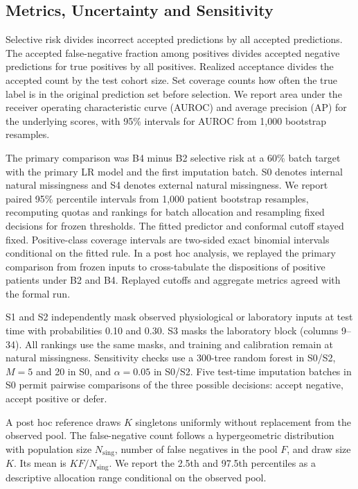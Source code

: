 \documentclass[conference]{IEEEtran}
\begin{document}
\subsection{Metrics, Uncertainty and Sensitivity}

Selective risk divides incorrect accepted predictions by all accepted predictions. The accepted false-negative fraction among positives divides accepted negative predictions for true positives by all positives. Realized acceptance divides the accepted count by the test cohort size. Set coverage counts how often the true label is in the original prediction set before selection. We report area under the receiver operating characteristic curve (AUROC) and average precision (AP) for the underlying scores, with 95\% intervals for AUROC from 1,000 bootstrap resamples.

The primary comparison was B4 minus B2 selective risk at a 60\% batch target with the primary LR model and the first imputation batch. S0 denotes internal natural missingness and S4 denotes external natural missingness. We report paired 95\% percentile intervals from 1,000 patient bootstrap resamples, recomputing quotas and rankings for batch allocation and resampling fixed decisions for frozen thresholds. The fitted predictor and conformal cutoff stayed fixed. Positive-class coverage intervals are two-sided exact binomial intervals conditional on the fitted rule. In a post hoc analysis, we replayed the primary comparison from frozen inputs to cross-tabulate the dispositions of positive patients under B2 and B4. Replayed cutoffs and aggregate metrics agreed with the formal run.

S1 and S2 independently mask observed physiological or laboratory inputs at test time with probabilities 0.10 and 0.30. S3 masks the laboratory block (columns 9--34). All rankings use the same masks, and training and calibration remain at natural missingness. Sensitivity checks use a 300-tree random forest in S0/S2, $M = 5$ and 20 in S0, and $\alpha = 0.05$ in S0/S2. Five test-time imputation batches in S0 permit pairwise comparisons of the three possible decisions: accept negative, accept positive or defer.

A post hoc reference draws $K$ singletons uniformly without replacement from the observed pool. The false-negative count follows a hypergeometric distribution with population size $N_{\mathrm{sing}}$, number of false negatives in the pool $F$, and draw size $K$. Its mean is $KF/N_{\mathrm{sing}}$. We report the 2.5th and 97.5th percentiles as a descriptive allocation range conditional on the observed pool.
\end{document}
